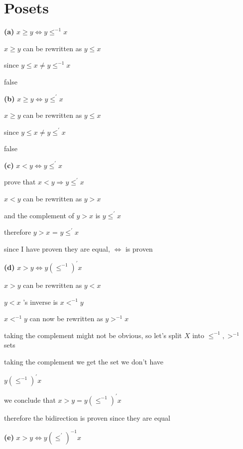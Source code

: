 \documentclass[12pts,A4]{article}
\begin{document}
\section{Posets}
\begin{flushleft}


\textbf{(a)} $ x \geq y \iff y \leq^{-1} x $ 

    $ x \geq y $ can be rewritten as
    $ y \leq x $

    since $y \leq x \not = y \leq^{-1} x$

    false
    \bigskip

\textbf{(b)} $ x \geq y \iff y \leq^{'} x $ 

    $ x \geq y $ can be rewritten as
    $ y \leq x $

    since $y \leq x \not = y \leq^{'} x$

    false

    \bigskip


\textbf{(c)} $ x < y \iff y \leq^{'} x $ 

    prove that $ x < y \Rightarrow y \leq^{'} x $  

    $x <  y$ can be rewritten as $ y >  x$

    and the complement of $ y > x$ is $ y \leq ^{'} x$ 
    
    therefore $y>x$ = $y \leq ^{'} x$
    \bigskip

    since I have proven they are equal, $\iff$ is proven

\textbf{(d)} $ x > y \iff y (\leq^{-1})^{'} x $ 

    $ x > y $ can be rewritten as $ y < x$

    $ y < x $ 's inverse is $ x < ^{-1} y $

    $ x < ^{-1} y $ can now be rewritten as $y > ^{-1} x$

    taking the complement might not be obvious, so let's split
    $X$ into $ \leq^{-1} ,>^{-1} $ sets
   
    taking the complement we get the set we don't have
    
    $y (\leq ^{-1})^{'} x$
    
    
    \bigskip

    we conclude that $ x > y =  y (\leq^{-1})^{'} x $  

    therefore the bidirection is proven since they are equal
    
    \bigskip

\textbf{(e)} $ x > y \iff y (\leq^{'})^{-1} x $ 
    

\end{flushleft}
\end{document}
